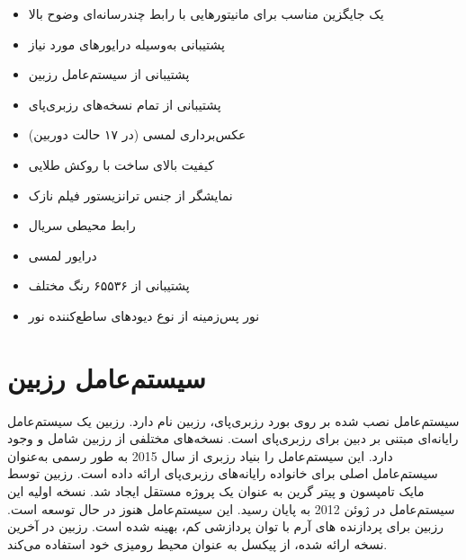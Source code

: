 {{\begin{itemize}
	\item  یک جایگزین مناسب برای مانیتورهایی با رابط چندرسانه‌ای وضوح بالا
	\item پشتیبانی به‌وسیله درایورهای مورد نیاز
	\item پشتیبانی از سیستم‌عامل رزبین
	\item پشتیبانی از تمام نسخه‌های رزبری‌پای
	\item عکس‌برداری لمسی (در ۱۷ حالت دوربین)
	\item کیفیت بالای ساخت با روکش طلایی
	\item نمایشگر از جنس ترانزیستور فیلم نازک 
	\item رابط محیطی سریال 
	\item درایور لمسی 
	\item پشتیبانی از ۶۵۵۳۶ رنگ مختلف
	\item نور پس‌زمینه از نوع دیود‌های ساطع‌کننده نور 
\end{itemize}


\section{سیستم‌عامل رزبین}
سیستم‌عامل نصب شده بر روی بورد رزبری‌پای، رزبین نام دارد. رزبین یک سیستم‌عامل رایانه‌ای مبتنی بر دبین برای رزبری‌پای است. نسخه‌های مختلفی از رزبین شامل  و  وجود دارد.
این سیستم‌عامل را بنیاد رزبری از سال 2015 به طور رسمی به‌عنوان سیستم‌عامل اصلی برای خانواده رایانه‌های رزبری‌پای ارائه داده است. رزبین توسط مایک تامپسون و پیتر گرین به عنوان یک پروژه مستقل ایجاد شد. نسخه اولیه این سیستم‌عامل در ژوئن 2012 به پایان رسید. این سیستم‌عامل هنوز در حال توسعه است. رزبین برای پردازنده های آرم با توان پردازشی کم، بهینه شده است. رزبین در آخرین نسخه ارائه شده، از پیکسل به عنوان محیط رومیزی خود استفاده می‌کند.

}}
